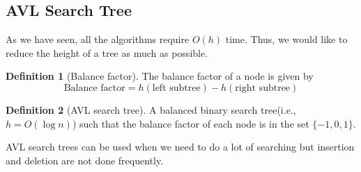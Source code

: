 \documentclass[10pt, a4paper]{extarticle}
\theoremstyle{definition}
\newtheorem{defn}{Definition}
\begin{document}
\subsection{AVL Search Tree}
As we have seen, all the algorithms require $O(h)$ time. Thus, we would like to reduce the height of a tree as much as possible.
\begin{defn}[Balance factor]
	The balance factor of a node is given by
	\[\text{Balance factor}=h(\text{left subtree})-h(\text{right subtree})\]
\end{defn}
\begin{defn}[AVL search tree]
	A balanced binary search tree(i.e., $h=O(\log n)$) such that the balance factor of each node is in the set $\{-1,0,1\}$.
\end{defn}

AVL search trees can be used when we need to do a lot of searching but insertion and deletion are not done frequently.
\end{document}
